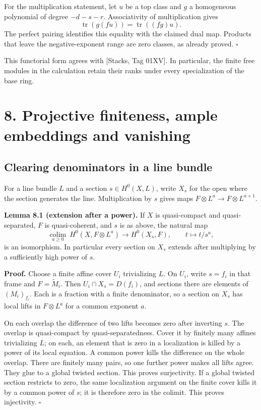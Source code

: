 \documentclass[11pt,a4paper,openany]{report}
\begin{document}
For the multiplication statement, let \(u\) be a top class and \(g\) a homogeneous polynomial of degree \(-d-s-r\). Associativity of multiplication gives \[
\operatorname{tr}(g(fu))=\operatorname{tr}((fg)u).
\] The perfect pairing identifies this equality with the claimed dual map. Products that leave the negative-exponent range are zero classes, as already proved. \(\square\)

This functorial form agrees with {[}Stacks, Tag 01XV{]}. In particular, the finite free modules in the calculation retain their ranks under every specialization of the base ring.

\section{8. Projective finiteness, ample embeddings and vanishing}\label{AG-RG-S01-projective-finiteness-ample-embeddings-and-vanishing}

\subsection{Clearing denominators in a line bundle}\label{AG-RG-S01-clearing-denominators-in-a-line-bundle}

For a line bundle \(L\) and a section \(s\in H^0(X,L)\), write \(X_s\) for the open where the section generates the line. Multiplication by \(s\) gives maps \(F\otimes L^a\to F\otimes L^{a+1}\).

\textbf{Lemma 8.1 (extension after a power).} If \(X\) is quasi-compact and quasi-separated, \(F\) is quasi-coherent, and \(s\) is as above, the natural map \[
\underset{a\ge0}{\operatorname{colim}}\ H^0(X,F\otimes L^a)
\longrightarrow H^0(X_s,F),\qquad t\longmapsto t/s^a,
\] is an isomorphism. In particular every section on \(X_s\) extends after multiplying by a sufficiently high power of \(s\).

\textbf{Proof.} Choose a finite affine cover \(U_i\) trivializing \(L\). On \(U_i\), write \(s=f_i\) in that frame and \(F=\widetilde M_i\). Then \(U_i\cap X_s=D(f_i)\), and sections there are elements of \((M_i)_{f_i}\). Each is a fraction with a finite denominator, so a section on \(X_s\) has local lifts in \(F\otimes L^a\) for a common exponent \(a\).

On each overlap the difference of two lifts becomes zero after inverting \(s\). The overlap is quasi-compact by quasi-separatedness. Cover it by finitely many affines trivializing \(L\); on each, an element that is zero in a localization is killed by a power of its local equation. A common power kills the difference on the whole overlap. There are finitely many pairs, so one further power makes all lifts agree. They glue to a global twisted section. This proves surjectivity. If a global twisted section restricts to zero, the same localization argument on the finite cover kills it by a common power of \(s\); it is therefore zero in the colimit. This proves injectivity. \(\square\)
\end{document}
